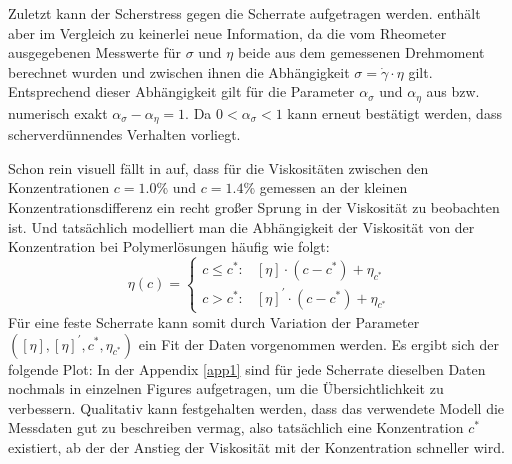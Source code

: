 \documentclass[11pt,a4paper,oneside]{scrartcl}
\begin{document}
Zuletzt kann der Scherstress gegen die Scherrate aufgetragen werden.  enthält aber im Vergleich zu  keinerlei neue Information, da die vom Rheometer ausgegebenen Messwerte für $\sigma$ und $\eta$ beide aus dem gemessenen Drehmoment berechnet wurden und zwischen ihnen die Abhängigkeit $\sigma=\dot\gamma\cdot\eta$ gilt.
Entsprechend dieser Abhängigkeit gilt für die Parameter $\alpha_\sigma$ und $\alpha_\eta$ aus  bzw.  numerisch exakt $\alpha_\sigma-\alpha_\eta=1$. Da $0<\alpha_\sigma<1$ kann erneut bestätigt werden, dass scherverdünnendes Verhalten vorliegt. \par
Schon rein visuell fällt in  auf, dass für die Viskositäten zwischen den Konzentrationen $c=1.0\%$ und $c=1.4\%$ gemessen an der kleinen Konzentrationsdifferenz ein recht großer Sprung in der Viskosität zu beobachten ist. Und tatsächlich modelliert man die Abhängigkeit der Viskosität von der Konzentration bei Polymerlösungen häufig wie folgt:
\begin{equation}
\eta(c)=\begin{cases} c\leq c^*: & [\eta]\cdot(c-c^*)+\eta_{c^*}\\
c>c^*: & [\eta]^\prime\cdot(c-c^*)+\eta_{c^*}
\end{cases}
\end{equation}
Für eine feste Scherrate kann somit durch Variation der Parameter $([\eta],[\eta]^\prime,c^*,\eta_{c^*})$ ein Fit der Daten vorgenommen werden. Es ergibt sich der folgende Plot:
In der Appendix \ref{app1} sind für jede Scherrate dieselben Daten nochmals in einzelnen Figures aufgetragen, um die Übersichtlichkeit zu verbessern. Qualitativ kann festgehalten werden, dass das verwendete Modell die Messdaten gut zu beschreiben vermag, also tatsächlich eine Konzentration $c^*$ existiert, ab der der Anstieg der Viskosität mit der Konzentration schneller wird. \\
\end{document}
